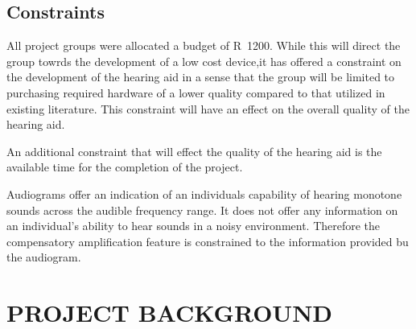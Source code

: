 \documentclass[10pt,twocolumn]{witseiepaper}
\begin{document}
\subsection{Constraints}
All project groups were allocated a budget of R~1200. While this will direct the group towrds the development of a low cost device,it has offered a constraint on the development of the hearing aid in a sense that the group will be limited to purchasing required hardware of a lower quality compared to that utilized in existing literature. This constraint will have an effect on the overall quality of the hearing aid.

An additional constraint that will effect the quality of the hearing aid is the available time for the completion of the project. 

Audiograms offer an indication of an individuals capability of hearing monotone sounds across the audible frequency range. It does not offer any information on an individual's ability to hear sounds in a noisy environment. Therefore the compensatory amplification feature is constrained to the information provided bu the audiogram. 

\section{PROJECT BACKGROUND}
\end{document}
